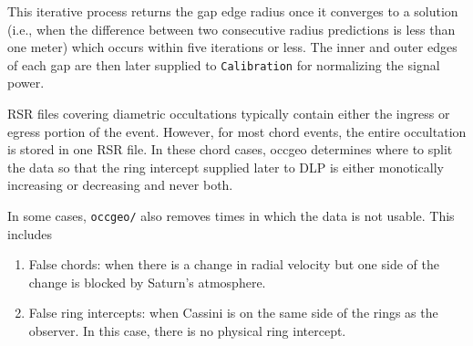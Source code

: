 \documentclass[titlepage, 12pt]{article}
\begin{document}
            This iterative process returns the gap edge radius once it converges to a solution (i.e., when the difference between two consecutive radius predictions is less than one meter) which occurs within five iterations or less. The inner and outer edges of each gap are then later supplied to \texttt{Calibration} for normalizing the signal power.
            \par\hfill\par
            RSR files covering diametric occultations typically contain either the ingress or egress portion of the event. However, for most chord events, the entire occultation is stored in one RSR file. In these chord cases, occgeo determines where to split the data so that the ring intercept supplied later to DLP is either monotically increasing or decreasing and never both.
            \par\hfill\par
            In some cases, \texttt{occgeo/} also removes times in which the data is not usable. This includes
            \begin{enumerate}
                \item False chords: when there is a change in radial velocity but one side of the change is blocked by Saturn's atmosphere.
                \item False ring intercepts: when Cassini is on the same side of the rings as the observer. In this case, there is no physical ring intercept.
            \end{enumerate}
    
            \par\hfill\par
            
\end{document}
